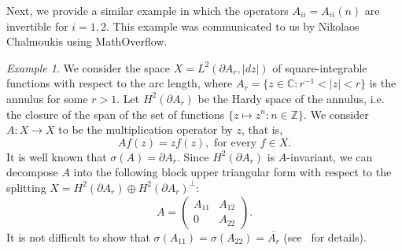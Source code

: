 \documentclass[11pt,reqno,a4paper]{amsart}
\theoremstyle{plain}
\numberwithin{equation}{section}
\theoremstyle{remark}
\newtheorem{example}{Example}
\begin{document}
Next, we provide a similar example in which the operators $A_{ii}=A_{ii}(n)$ are invertible for $i=1, 2$. This example was communicated to us by Nikolaos Chalmoukis using MathOverflow.

 \begin{example}\label{EX2}
We consider the space $X=L^2(\partial A_r, |dz|)$ of square-integrable functions with respect to the arc length, where $A_r=\{z \in \mathbb C : r^{-1} < |z| < r \}$ is the annulus for some $r>1$. Let $H^2(\partial A_r)$ be the Hardy space of the annulus, i.e. the closure of the span of the set of functions $\{z \mapsto z^n : n \in \mathbb Z\}$. We consider $A \colon X \to X$ to be the multiplication operator by $z$, that is,  $$A f(z)=z f(z), \text{ for every } f \in X.$$ It is well known that $\sigma(A)=\partial A_r$. Since $H^2(\partial A_r)$ is $A$-invariant, we can decompose $A$ into the following block upper triangular form with respect to the splitting $X=H^2(\partial A_r)\oplus H^2(\partial A_r)^\perp$:
$$A= \begin{pmatrix}
    A_{11} & A_{12} \\ 0 & A_{22}
\end{pmatrix}.$$
It is not difficult to show that $\sigma(A_{11})=\sigma (A_{22})=\overline{A_r}$ (see~\cite{NC} for details). 

\end{example}
\end{document}

